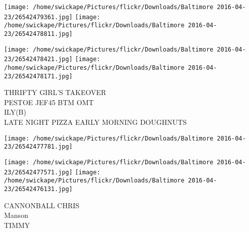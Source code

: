 \documentclass[10pt,letterpaper]{article}
\begin{document}
\texttt{[image: /home/swickape/Pictures/flickr/Downloads/Baltimore 2016-04-23/26542479361.jpg]}
\texttt{[image: /home/swickape/Pictures/flickr/Downloads/Baltimore 2016-04-23/26542478811.jpg]}

\texttt{[image: /home/swickape/Pictures/flickr/Downloads/Baltimore 2016-04-23/26542478421.jpg]}
\texttt{[image: /home/swickape/Pictures/flickr/Downloads/Baltimore 2016-04-23/26542478171.jpg]}

THRIFTY GIRL'S TAKEOVER\\
PESTOE JEF45 BTM OMT\\
ILY(B)\\
LATE NIGHT PIZZA EARLY MORNING DOUGHNUTS
\pagebreak

\texttt{[image: /home/swickape/Pictures/flickr/Downloads/Baltimore 2016-04-23/26542477781.jpg]}

\vspace{0.25in}
\texttt{[image: /home/swickape/Pictures/flickr/Downloads/Baltimore 2016-04-23/26542477571.jpg]}
\texttt{[image: /home/swickape/Pictures/flickr/Downloads/Baltimore 2016-04-23/26542476131.jpg]}

CANNONBALL CHRIS\\
Manson\\
TIMMY
\pagebreak
\end{document}
